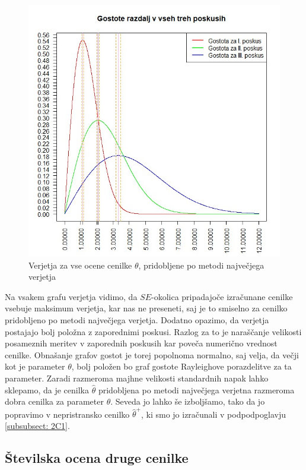 \documentclass[a4paper, 10pt]{article}
\begin{document}
	\begin{figure}[h!]
		\label{fig: 2Dplot4}
		\centering
		\includegraphics[scale = 0.45]{VerjetjeMNV4}
		\caption{Verjetja za vse ocene cenilke $\theta$, pridobljene po metodi največjega verjetja}
	\end{figure}
	
	Na vsakem grafu verjetja vidimo, da $SE$-okolica pripadajoče izračunane cenilke vsebuje maksimum verjetja, kar nas ne preseneti, saj je to smiselno za cenilko pridobljeno po metodi največjega verjetja. Dodatno opazimo, da verjetja postajajo bolj položna z zaporednimi poskusi. Razlog za to je naraščanje velikosti posameznih meritev v zaporednih poskusih kar poveča numerično vrednost cenilke. Obnašanje grafov gostot je torej popolnoma normalno, saj velja, da večji kot je parameter $\theta$, bolj položen bo graf gostote Rayleighove porazdelitve za ta parameter. 
	Zaradi razmeroma majhne velikosti standardnih napak lahko sklepamo, da je cenilka $\widehat{\theta}$ pridobljena po metodi največjega verjetna razmeroma dobra cenilka za parameter $\theta$. Seveda jo lahko še izboljšamo, tako da jo popravimo v nepristransko cenilko $\widehat{\theta}^{+}$, ki smo jo izračunali v podpodpoglavju \ref{subsubsect: 2C1}.
	
	\subsection{Številska ocena druge cenilke} \label{subsect: 2E}
	
\end{document}
